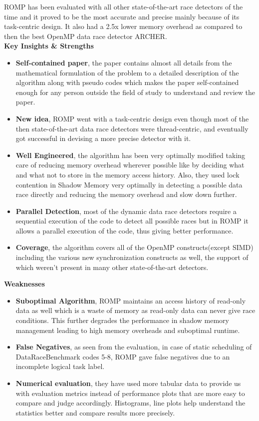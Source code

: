 \documentclass[a4paper]{article}
\begin{document}
ROMP has been evaluated with all other state-of-the-art race detectors of the time and it proved to be the most accurate and precise mainly because of its task-centric design. It also had a 2.5x lower memory overhead as compared to then the best OpenMP data race detector ARCHER. \\
\newline
\newline
{\bf\Large Key Insights \& Strengths} \\
\begin{itemize}
\item {\bf Self-contained paper}, the paper contains almost all details from the mathematical formulation of the problem to a detailed description of the algorithm along with pseudo codes which makes the paper self-contained enough for any person outside the field of study to understand and review the paper.
\item {\bf New idea}, ROMP went with a task-centric design even though most of the then state-of-the-art data race detectors were thread-centric, and eventually got successful in devising a more precise detector with it.
\item {\bf Well Engineered}, the algorithm has been very optimally modified taking care of reducing memory overhead wherever possible like by deciding what and what not to store in the memory access history. Also, they used lock contention in Shadow Memory very optimally in detecting a possible data race directly and reducing the memory overhead and slow down further.
\item {\bf Parallel Detection}, most of the dynamic data race detectors require a sequential execution of the code to detect all possible races but in ROMP it allows a parallel execution of the code, thus giving better performance. 
\item {\bf Coverage}, the algorithm covers all of the OpenMP constructs(except SIMD) including the various new synchronization constructs as well, the support of which weren't present in many other state-of-the-art detectors.
\end{itemize}
\vspace{6cm}
{\bf\Large Weaknesses} \\
\begin{itemize}
\item {\bf Suboptimal Algorithm}, ROMP maintains an access history of read-only data as well which is a waste of memory as read-only data can never give race conditions. This further degrades the performance in shadow memory management leading to high memory overheads and suboptimal runtime.
\item {\bf False Negatives}, as seen from the evaluation, in case of static scheduling of DataRaceBenchmark codes 5-8, ROMP gave false negatives due to an incomplete logical task label. 
\item {\bf Numerical evaluation}, they have used more tabular data to provide us with evaluation metrics instead of performance plots that are more easy to compare and judge accordingly. Histograms, line plots help understand the statistics better and compare results more precisely.
\end{itemize}
\end{document}
